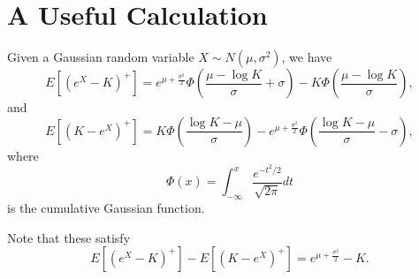 \chapter{A Useful Calculation} \label{A:useful}

Given a Gaussian random variable $X\sim N(\mu,\sigma^2)$, we have
\begin{equation} \label{E:int_call}
  E[(e^X-K)^+] = 
    e^{\mu+\frac{\sigma^2}{2}} 
      \Phi \left( \frac{\mu-\log{K}}{\sigma}+\sigma \right)
    -K \Phi \left( \frac{\mu-\log{K}}{\sigma} \right),
\end{equation}
and
\begin{equation} \label{E:int_put}
  E[(K-e^X)^+] = 
    K \Phi \left( \frac{\log{K}-\mu}{\sigma} \right)
    - e^{\mu+\frac{\sigma^2}{2}} 
      \Phi \left( \frac{\log{K}-\mu}{\sigma}-\sigma \right),
\end{equation}
where 
\[
  \Phi(x) = \int_{-\infty}^x \frac{e^{-t^2/2}}{\sqrt{2\pi}} dt
\]
is the cumulative Gaussian function.

Note that these satisfy
\[
  E[(e^X-K)^+] - E[(K-e^X)^+] = e^{\mu+\frac{\sigma^2}{2}} - K.
\]

